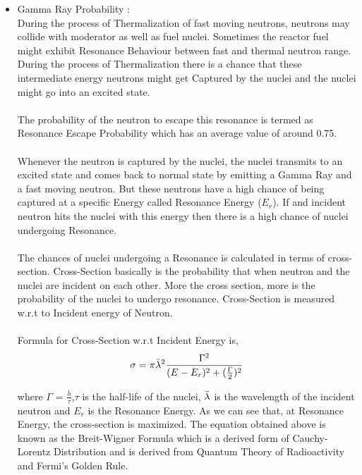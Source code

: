 \documentclass{article}
\begin{document}
\begin{itemize}
\begin{itemize}
\begin{itemize}
        \item Gamma Ray Probability :\\
            During the process of Thermalization of fast moving neutrons, neutrons may collide with moderator as well as fuel nuclei. Sometimes the reactor fuel might exhibit Resonance Behaviour between fast and thermal neutron range. During the process of Thermalization there is a chance that these intermediate energy neutrons might get Captured by the nuclei and the nuclei might go into an excited state.\\
            \\
            The probability of the neutron to escape this resonance is termed as Resonance Escape Probability which has an average value of around 0.75.\\
            \\
            Whenever the neutron is captured by the nuclei, the nuclei transmits to an excited state and comes back to normal state by emitting a Gamma Ray and a fast moving neutron. But these neutrons have a high chance of being captured at a specific Energy called Resonance Energy ($E_r$). If and incident neutron hits the nuclei with this energy then there is a high chance of nuclei undergoing Resonance.\\
            \\
            The chances of nuclei undergoing a Resonance is calculated in terms of cross-section. Cross-Section basically is the probability that when neutron and the nuclei are incident on each other. More the cross section, more is the probability of the nuclei to undergo resonance. Cross-Section is measured w.r.t to Incident energy of Neutron.\\
            \\
            Formula for Cross-Section w.r.t Incident Energy is,
            $$\sigma = \pi \Bar{\lambda}^2 \frac{\Gamma^2}{(E - E_r)^2 + (\frac{\Gamma}{2})^2}$$
            
            where $\Gamma$ = $\frac{\bar{h}}{\tau}$,$\tau$ is the half-life of the nuclei, $\Bar{\lambda}$ is the wavelength of the incident neutron and $E_r$ is the Resonance Energy. As we can see that, at Resonance Energy, the cross-section is maximized. The equation obtained above is known as the Breit-Wigner Formula which is a derived form of Cauchy-Lorentz Distribution and is derived from Quantum Theory of Radioactivity and Fermi's Golden Rule.
            
                
    \end{itemize}
    
    
   
 \end{itemize}
\end{itemize}
\end{document}
